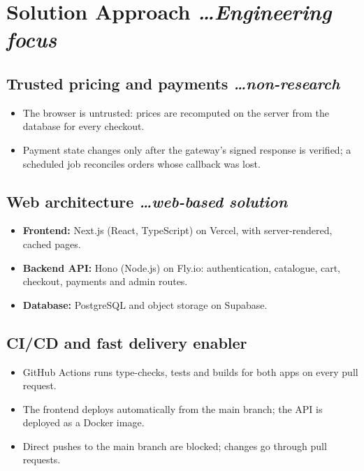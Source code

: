 \documentclass[11pt,a4paper]{article}
\newcommand{\BvrHint}[1]{%
  {\normalfont\normalsize\itshape\hfill #1}}
\begin{document}
\section{Solution Approach %
\BvrHint{\ldots Engineering focus}}
\subsection{Trusted pricing and payments %
\BvrHint{\ldots non-research}}
\begin{itemize}[leftmargin=0.7cm]
    \item The browser is untrusted: prices are recomputed on the server from the
          database for every checkout.
    \item Payment state changes only after the gateway's signed response is
          verified; a scheduled job reconciles orders whose callback was lost.
\end{itemize}

\subsection{Web architecture %
\BvrHint{\ldots web-based solution}}
\begin{itemize}[leftmargin=0.7cm]
    \item \textbf{Frontend:} Next.js (React, TypeScript) on Vercel, with
          server-rendered, cached pages.
    \item \textbf{Backend API:} Hono (Node.js) on Fly.io: authentication,
          catalogue, cart, checkout, payments and admin routes.
    \item \textbf{Database:} PostgreSQL and object storage on Supabase.
\end{itemize}

\subsection{CI/CD and fast delivery enabler}
\begin{itemize}[leftmargin=0.7cm]
    \item GitHub Actions runs type-checks, tests and builds for both apps on
          every pull request.
    \item The frontend deploys automatically from the main branch; the API is
          deployed as a Docker image.
    \item Direct pushes to the main branch are blocked; changes go through pull
          requests.
\end{itemize}
\end{document}
